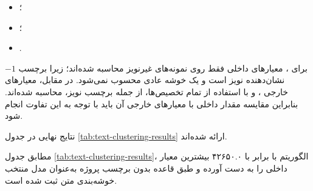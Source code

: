 \documentclass[12pt,a4paper,oneside]{report}
\begin{document}
\begin{itemize}
	\item {}؛
	\item {}؛
	\item {}.
\end{itemize}

برای
،
معیارهای داخلی فقط روی نمونه‌های غیرنویز محاسبه شده‌اند؛ زیرا برچسب
$-1$
نشان‌دهنده نویز است و یک خوشه عادی محسوب نمی‌شود. در مقابل، معیارهای خارجی
،
و
با استفاده از تمام تخصیص‌ها، از جمله برچسب نویز، محاسبه شده‌اند. بنابراین مقایسه مقدار داخلی
با معیارهای خارجی آن باید با توجه به این تفاوت انجام شود.

نتایج نهایی در جدول
\ref{tab:text-clustering-results}
ارائه شده‌اند.

\begin{table}[H]
\centering
\caption{مقایسه نتایج الگوریتم‌های خوشه‌بندی داده‌های متنی}
\label{tab:text-clustering-results}
\small
{}
\end{table}

مطابق جدول
\ref{tab:text-clustering-results}،
الگوریتم
با
برابر با ۴۲۶۵۰.۰ بیشترین معیار داخلی را به دست آورده و طبق قاعده بدون برچسب پروژه به‌عنوان مدل منتخب خوشه‌بندی متن ثبت شده است.
\end{document}
